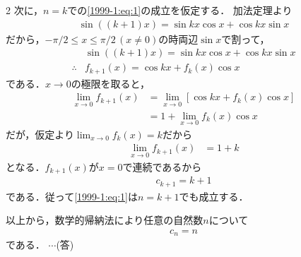 \documentclass[../../../../main.tex]{subfiles}
\begin{document}
\begin{multicols}{2}
    次に，$n=k$での\cref{1999-1:eq:1}の成立を仮定する．
    加法定理より
    \begin{align*}
        \sin((k+1)x) = \sin kx \cos x + \cos kx \sin x
    \end{align*}
    だから，$-\pi/2 \le x \le \pi/2\, (x\neq 0)$の時両辺$\sin x$で割って，
    \begin{align*}
         & \sin((k+1)x) = \sin kx \cos x + \cos kx \sin x \\
        \therefore
         & f_{k+1}(x) = \cos kx + f_{k}(x) \cos x
    \end{align*}
    である．$x\to 0$の極限を取ると，
    \begin{align*}
        \lim_{x\to 0} f_{k+1}(x)
         & = \lim_{x\to 0} \left[\cos kx + f_{k}(x) \cos x\right] \\
         & = 1  + \lim_{x\to 0} f_{k}(x) \cos x
    \end{align*}
    だが，仮定より$\lim_{x\to 0} f_{k}(x)=k$だから
    \begin{align*}
        \lim_{x\to 0} f_{k+1}(x)
         & = 1 + k
    \end{align*}
    となる．$f_{k+1}(x)$が$x=0$で連続であるから
    \begin{align*}
        c_{k+1} = k+1
    \end{align*}
    である．従って\cref{1999-1:eq:1}は$n=k+1$でも成立する．

    以上から，数学的帰納法により任意の自然数$n$について
    \begin{align*}
        c_{n} = n
    \end{align*}
    である． $\cdots$(答)


    \newpage
\end{multicols}
\end{document}
